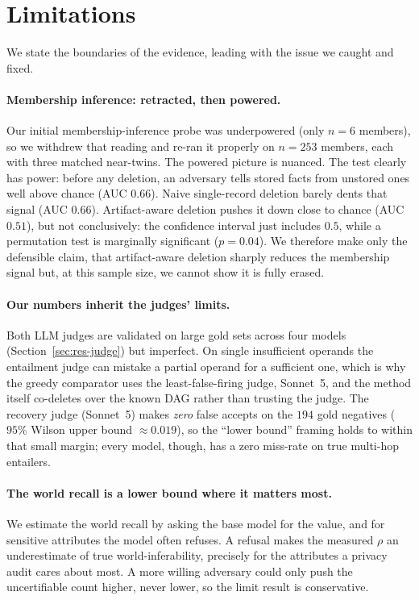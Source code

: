 \documentclass[letterpaper]{article}
\begin{document}
\section{Limitations}\label{sec:limitations}

We state the boundaries of the evidence, leading with the issue we caught and fixed.

\paragraph{Membership inference: retracted, then powered.} Our initial
membership-inference probe was underpowered (only $n{=}6$ members), so we withdrew that
reading and re-ran it properly on $n{=}253$ members, each with three matched near-twins. The powered picture is nuanced. The test clearly has
power: before any deletion, an adversary tells stored facts from unstored ones well
above chance (AUC $0.66$). Naive single-record deletion barely dents that signal
(AUC $0.66$). Artifact-aware deletion pushes it down close to chance (AUC $0.51$), but
not conclusively: the confidence interval just includes $0.5$, while a permutation test
is marginally significant ($p{=}0.04$). We therefore make only the defensible claim, that
artifact-aware deletion sharply reduces the membership signal but, at this sample size,
we cannot show it is fully erased.

\paragraph{Our numbers inherit the judges' limits.} Both LLM judges are validated on
large gold sets across four models (Section~\ref{sec:res-judge}) but imperfect. On single
insufficient operands the entailment judge can mistake a partial operand for a sufficient
one, which is why the greedy comparator uses the least-false-firing judge, Sonnet~5, and
the method itself co-deletes over the known DAG rather than trusting the judge. The
recovery judge (Sonnet~5) makes \emph{zero} false accepts on the $194$ gold negatives
($95\%$ Wilson upper bound $\approx\!0.019$), so the ``lower bound'' framing holds to
within that small margin; every model, though, has a zero miss-rate on true multi-hop
entailers.

\paragraph{The world recall is a lower bound where it matters most.} We estimate the
world recall by asking the base model for the value, and for sensitive attributes
the model often refuses. A refusal makes the measured $\rho$ an underestimate of true
world-inferability, precisely for the attributes a privacy audit cares about most. A
more willing adversary could only push the uncertifiable count higher, never lower, so
the limit result is conservative.
\end{document}
